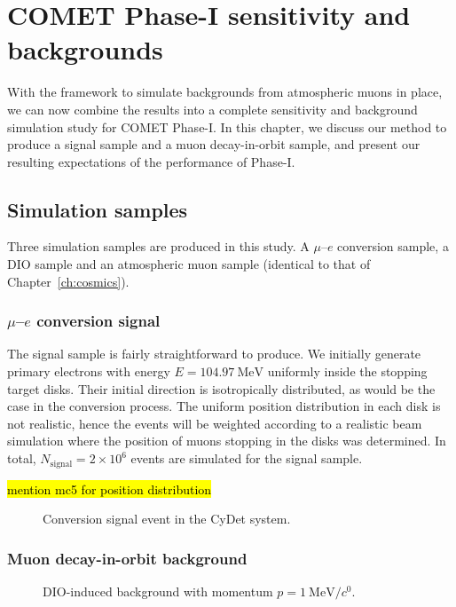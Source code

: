 \chapter{COMET Phase-I sensitivity and backgrounds}

With the framework to simulate backgrounds from atmospheric muons in place, we
can now combine the results into a complete sensitivity and background
simulation study for COMET Phase-I. In this chapter, we discuss our method to
produce a signal sample and a muon decay-in-orbit sample, and present our
resulting expectations of the performance of Phase-I.

\section{Simulation samples}
Three simulation samples are produced in this study. A $\mu$--$e$ conversion
sample, a DIO sample and an atmospheric muon sample (identical to that of
Chapter~\ref{ch:cosmics}). 

\subsection{$\mu$--$e$ conversion signal}
The signal sample is fairly straightforward to produce. We initially generate
primary electrons with energy $E=\SI{104.97}{\MeV}$ uniformly inside the
stopping target disks. Their initial direction is isotropically distributed, as
would be the case in the conversion process. The uniform position distribution
in each disk is not realistic, hence the events will be weighted according to a
realistic beam simulation where the position of muons stopping in the disks was
determined. In total, $N_\mathrm{signal} = 2\times 10^6$ events are simulated
for the signal sample.

\hl{mention mc5 for position distribution}


\begin{figure}
    \centering
    
    \caption{Conversion signal event in the CyDet system.}
    \label{fig:signal_in_cydet}
\end{figure}


\subsection{Muon decay-in-orbit background}
\begin{figure}
    \centering
    
    \caption{DIO-induced background with momentum  $p=\SI{1}{\MeV/\clight}$.}
    \label{fig:muon_dio_in_cydet}
\end{figure}

